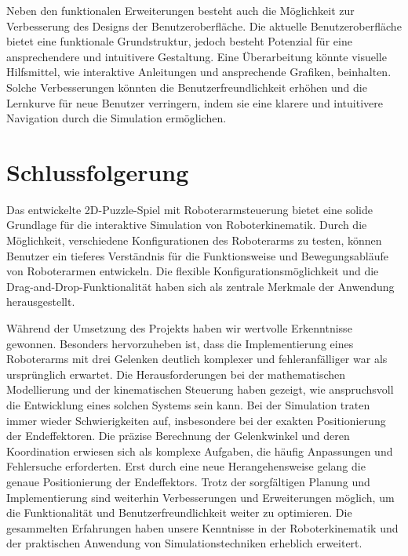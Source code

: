 \documentclass[12pt]{article}
\begin{document}
        Neben den funktionalen Erweiterungen besteht auch die Möglichkeit zur Verbesserung des Designs der
        Benutzeroberfläche. Die aktuelle Benutzeroberfläche bietet eine funktionale Grundstruktur, jedoch besteht
        Potenzial für eine ansprechendere und intuitivere Gestaltung. Eine Überarbeitung könnte visuelle Hilfsmittel,
        wie interaktive Anleitungen und ansprechende Grafiken, beinhalten. Solche Verbesserungen könnten die
        Benutzerfreundlichkeit erhöhen und die Lernkurve für neue Benutzer verringern, indem sie eine klarere
        und intuitivere Navigation durch die Simulation ermöglichen.

    \section{Schlussfolgerung}
        Das entwickelte 2D-Puzzle-Spiel mit Roboterarmsteuerung bietet eine solide Grundlage für die interaktive
        Simulation von Roboterkinematik. Durch die Möglichkeit, verschiedene Konfigurationen des Roboterarms zu 
        testen, können Benutzer ein tieferes Verständnis für die Funktionsweise und Bewegungsabläufe von Roboterarmen
        entwickeln. Die flexible Konfigurationsmöglichkeit und die Drag-and-Drop-Funktionalität haben sich als
        zentrale Merkmale der Anwendung herausgestellt.
        
        Während der Umsetzung des Projekts haben wir wertvolle Erkenntnisse gewonnen. Besonders hervorzuheben
        ist, dass die Implementierung eines Roboterarms mit drei Gelenken deutlich komplexer und fehleranfälliger
        war als ursprünglich erwartet. Die Herausforderungen bei der mathematischen Modellierung und der
        kinematischen Steuerung haben gezeigt, wie anspruchsvoll die Entwicklung eines solchen Systems sein kann.
        Bei der Simulation traten immer wieder Schwierigkeiten auf, insbesondere bei der exakten Positionierung der 
        Endeffektoren. Die präzise Berechnung der Gelenkwinkel und deren Koordination erwiesen sich als komplexe
        Aufgaben, die häufig Anpassungen und Fehlersuche erforderten. Erst durch eine neue Herangehensweise gelang
        die genaue Positionierung der Endeffektors. Trotz der sorgfältigen Planung und Implementierung sind weiterhin 
        Verbesserungen und Erweiterungen möglich, um die Funktionalität und Benutzerfreundlichkeit weiter zu 
        optimieren. Die gesammelten Erfahrungen haben unsere Kenntnisse in der Roboterkinematik und der praktischen
        Anwendung von Simulationstechniken erheblich erweitert.
    
\end{document}
